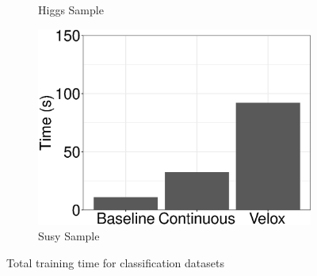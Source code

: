 \documentclass{vldb}
\begin{document}
\begin{figure}[h]
\begin{subfigure}[b]{0.5\columnwidth}
	\caption{Higgs Sample}
	\label{fig:higgs-sample-times}
\end{subfigure}
\begin{subfigure}[b]{0.5\columnwidth}
	\centering
  	\includegraphics[width=\linewidth, height=\linewidth,keepaspectratio]{../images/experiment-results/susy-sample-times.eps}
	\caption{Susy Sample}
	\label{fig:susy-sample-times}
\end{subfigure}
 \caption{Total training time for classification datasets}
 \label{fig:classification-running-time}
\end{figure}
\end{document}
